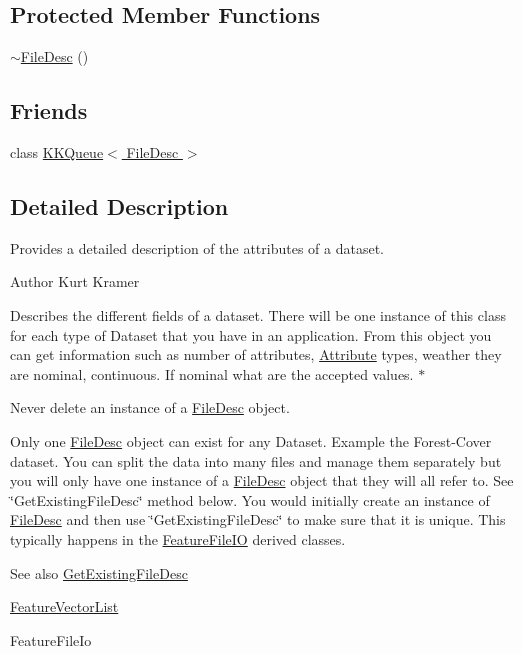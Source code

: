 \subsection*{Protected Member Functions}
\begin{DoxyCompactItemize}
\item 
\hyperlink{class_k_k_m_l_l_1_1_file_desc_a71a1a188a13bd2dccab87eb8c20ab66f}{$\sim$\+File\+Desc} ()
\end{DoxyCompactItemize}
\subsection*{Friends}
\begin{DoxyCompactItemize}
\item 
class \hyperlink{class_k_k_m_l_l_1_1_file_desc_a7ca7163d7420f017802ef34ae67e9515}{K\+K\+Queue$<$ File\+Desc $>$}
\end{DoxyCompactItemize}


\subsection{Detailed Description}
Provides a detailed description of the attributes of a dataset. 

\begin{DoxyAuthor}{Author}
Kurt Kramer
\end{DoxyAuthor}
Describes the different fields of a dataset. There will be one instance of this class for each type of Dataset that you have in an application. From this object you can get information such as number of attributes, \hyperlink{class_k_k_m_l_l_1_1_attribute}{Attribute} types, weather they are nominal, continuous. If nominal what are the accepted values. $\ast$

Never delete an instance of a \hyperlink{class_k_k_m_l_l_1_1_file_desc}{File\+Desc} object.

Only one \hyperlink{class_k_k_m_l_l_1_1_file_desc}{File\+Desc} object can exist for any Dataset. Example the Forest-\/\+Cover dataset. You can split the data into many files and manage them separately but you will only have one instance of a \hyperlink{class_k_k_m_l_l_1_1_file_desc}{File\+Desc} object that they will all refer to. See \char`\"{}\+Get\+Existing\+File\+Desc\char`\"{} method below. You would initially create an instance of \hyperlink{class_k_k_m_l_l_1_1_file_desc}{File\+Desc} and then use \char`\"{}\+Get\+Existing\+File\+Desc\char`\"{} to make sure that it is unique. This typically happens in the \hyperlink{class_k_k_m_l_l_1_1_feature_file_i_o}{Feature\+File\+IO} derived classes. \begin{DoxySeeAlso}{See also}
\hyperlink{class_k_k_m_l_l_1_1_file_desc_ab64013b479502d2761a9f11570a565bc}{Get\+Existing\+File\+Desc} 

\hyperlink{class_k_k_m_l_l_1_1_feature_vector_list}{Feature\+Vector\+List} 

Feature\+File\+Io 
\end{DoxySeeAlso}


